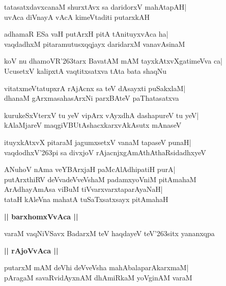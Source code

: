 \documentclass[twoside,12pt,openright]{book}
\def\S{\char'263}
\newcounter{shloka}[chapter]
\def\uvaca#1{\centerline{{\large\textbf{#1}}}}
\begin{document}
\begin{shloka}%
tatasatxdavxcanaM shurxtAvx sa daridorxV mahAtapAH|\\
uvAca diVnayA vAcA kimeVtaditi putarxkAH
\end{shloka}

\begin{shloka}%
adhamaR ESa vaH putArxH pitA tAnituyxvAca ha|\\
vaqdadhxM pitaramutusxqqjayx daridarxM vanavAsinaM
\end{shloka}

\begin{shloka}%
koV nu dhamoVR\S tarx BavatAM mAM tayxkAtxvXgatimeVva ca|\\
UcusetxV kalipxtA vaqtitxsatxva tAta bata shaqNu
\end{shloka}

\begin{shloka}%
vitatxmeVtatupxrA rAjAcnx sa teV dAsayxti puSakxlaM|\\
dhanaM gArxmasahasArxNi parxBAteV paThatasatxva
\end{shloka}

\begin{shloka}%
kurukeSxVterxV tu yeV vipArx vAyxdhA dashapureV tu yeV|\\
kAlaMjareV maqgiVBUtAshacxkarxvAkAsutx mAnaseV
\end{shloka}

\begin{shloka}%
ituyxkAtxvX pitaraM jagumxsetxV vanaM tapaseV punaH|\\
vaqdodhxV\S pi sa divxjoV rAjacnjxgAmAthAthaRsidadhxyeV
\end{shloka}

\begin{shloka}%
ANuhoV nAma veYBArxjaH paMcAlAdhipatiH purA|\\
putArxthiRV deVvadeVveVshaM padamxyoVniM pitAmahaM\\

ArAdhayAmAsa viBuM tiVvarxvarxtaparAyaNaH|\\
tataH kAleVna mahatA tuSaTxsatxsayx pitAmahaH
\end{shloka}

\uvaca{|| barxhomxVvAca ||}
\begin{shloka}%
varaM vaqNiVSavx BadarxM teV haqdayeV teV\S sitx yananxqpa
\end{shloka}

\uvaca{|| rAjoVvAca ||}
\begin{shloka}%
putarxM mAM deVhi deVveVsha mahAbalaparAkarxmaM|\\
pAragaM savaRvidAyxnAM dhAmiRkaM yoVginAM varaM 
\end{shloka}
\end{document}
